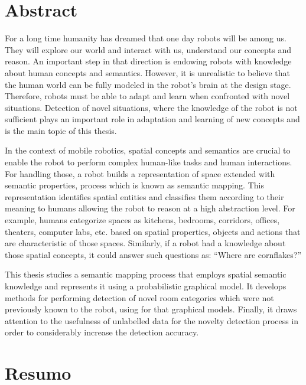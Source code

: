 \chapter*{Abstract}

For a long time humanity has dreamed that one day robots will be among us. They will explore our world
and interact with us, understand our concepts and reason. An important step in that direction is endowing 
robots with knowledge about human concepts and semantics. However, it is unrealistic to believe that the 
human world can be fully modeled in the robot's brain at the design stage. Therefore, robots must be able 
to adapt and learn when confronted with novel situations. Detection of novel situations, where the knowledge
of the robot is not sufficient plays an important role in adaptation and learning of new concepts and 
is the main topic of this thesis.

In the context of mobile robotics, spatial concepts and semantics are crucial to enable the robot to perform
complex human-like tasks and human interactions. For handling those, a robot builds a representation
of space extended with semantic properties, process which is known as semantic mapping.
This representation identifies spatial entities and classifies them according to their meaning to
humans allowing the robot to reason at a high abstraction level. For example, humans categorize spaces as 
kitchens, bedrooms, corridors, offices, theaters, computer labs, etc. based on spatial properties, 
objects and actions that are characteristic of those spaces. Similarly, if a robot had a knowledge about
those spatial concepts, it could answer such questions as: ``Where are cornflakes?''

This thesis studies a semantic mapping process that employs spatial semantic knowledge
and represents it using a probabilistic graphical model. It develops methods 
for performing detection of novel room categories which were not previously known to the robot,
using for that graphical models. Finally, it draws attention to the usefulness of unlabelled data for the 
novelty detection process in order to considerably increase the detection accuracy.


\chapter*{Resumo}


